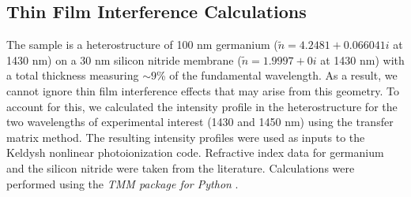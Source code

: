 \subsection{Thin Film Interference Calculations}
\label{sec:thin_film_interference}

%	

The sample is a heterostructure of 100 nm germanium ($\tilde{n} = 4.2481 + 0.066041i$ at 1430 nm) on a 30 nm silicon nitride membrane ($\tilde{n}=1.9997 + 0i$ at 1430 nm) with a total thickness measuring $\sim 9$\% of the fundamental wavelength. As a result, we cannot ignore thin film interference effects that may arise from this geometry. To account for this, we calculated the intensity profile in the heterostructure for the two wavelengths of experimental interest (1430 and 1450 nm) using the transfer matrix method. The resulting intensity profiles were used as inputs to the Keldysh nonlinear photoionization code. Refractive index data for germanium \cite{nunleyOpticalConstantsGermanium2016} and the silicon nitride \cite{lukeBroadbandMidinfraredFrequency2015} were taken from the literature. Calculations were performed using the \textit{TMM package for Python} \cite{byrnesTmmSimulateLight2017,byrnesMultilayerOpticalCalculations2019}.

